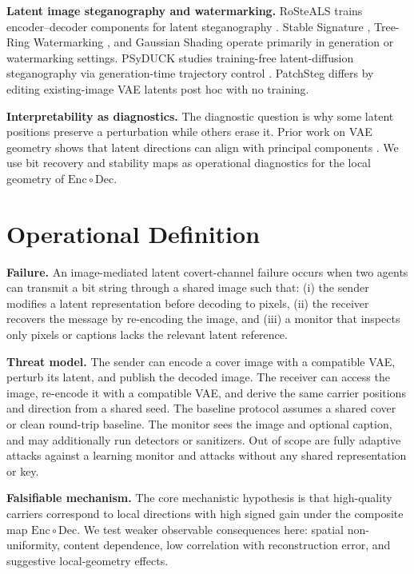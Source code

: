 \documentclass{article}
\begin{document}
\textbf{Latent image steganography and watermarking.}
RoSteALS trains encoder--decoder components for latent steganography \citep{bui2023rosteals}. Stable Signature \citep{fernandez2023stable}, Tree-Ring Watermarking \citep{wen2023treering}, and Gaussian Shading \citep{yang2024gaussian} operate primarily in generation or watermarking settings. PSyDUCK studies training-free latent-diffusion steganography via generation-time trajectory control \citep{jiang2025psyduck}. PatchSteg differs by editing existing-image VAE latents post hoc with no training.

\textbf{Interpretability as diagnostics.}
The diagnostic question is why some latent positions preserve a perturbation while others erase it. Prior work on VAE geometry shows that latent directions can align with principal components \citep{rolinek2019variational}. We use bit recovery and stability maps as operational diagnostics for the local geometry of $\mathrm{Enc}\circ\mathrm{Dec}$.

\section{Operational Definition}

\textbf{Failure.}
An image-mediated latent covert-channel failure occurs when two agents can transmit a bit string through a shared image such that: (i) the sender modifies a latent representation before decoding to pixels, (ii) the receiver recovers the message by re-encoding the image, and (iii) a monitor that inspects only pixels or captions lacks the relevant latent reference.

\textbf{Threat model.}
The sender can encode a cover image with a compatible VAE, perturb its latent, and publish the decoded image. The receiver can access the image, re-encode it with a compatible VAE, and derive the same carrier positions and direction from a shared seed. The baseline protocol assumes a shared cover or clean round-trip baseline. The monitor sees the image and optional caption, and may additionally run detectors or sanitizers. Out of scope are fully adaptive attacks against a learning monitor and attacks without any shared representation or key.

\textbf{Falsifiable mechanism.}
The core mechanistic hypothesis is that high-quality carriers correspond to local directions with high signed gain under the composite map $\mathrm{Enc}\circ\mathrm{Dec}$. We test weaker observable consequences here: spatial non-uniformity, content dependence, low correlation with reconstruction error, and suggestive local-geometry effects.
\end{document}

